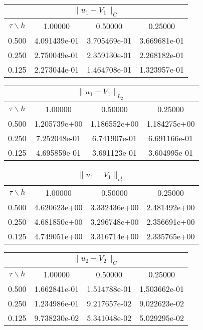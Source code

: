 \begin{center}
\begin{tabular}{||c|c|c|c||}
\hline
\hline
\multicolumn{4}{||c||}{$\|u_1-V_1\| _{C}$}\\ 
\hline
\hline
$\tau \backslash h$ & 1.00000 & 0.50000 & 0.25000\\ 
\hline 
0.500& 4.091439e-01 &3.705469e-01 &3.669681e-01 \\
\hline
0.250& 2.750049e-01 &2.359130e-01 &2.268182e-01 \\ 
\hline
0.125& 2.273044e-01 &1.464708e-01 &1.323957e-01 \\ 
\hline
\hline
\end{tabular}
\end{center}
\begin{center}
\begin{tabular}{||c|c|c|c||}
\hline
\hline
\multicolumn{4}{||c||}{$\|u_1-V_1\| _{L_2}$}\\ 
\hline
\hline 
$\tau \backslash h$ & 1.00000 & 0.50000 & 0.25000\\ 
\hline 
0.500& 1.205739e+00 &1.186552e+00 &1.184275e+00 \\
\hline
0.250& 7.252048e-01 &6.741907e-01 &6.691166e-01 \\ 
\hline
0.125& 4.695859e-01 &3.691123e-01 &3.604995e-01 \\ 
\hline
\hline
\end{tabular}
\end{center}
\begin{center}
\begin{tabular}{||c|c|c|c||}
\hline
\hline
\multicolumn{4}{||c||}{$\|u_1-V_1\| _{v_2^1}$}\\ 
\hline
\hline
$\tau \backslash h$ & 1.00000 & 0.50000 & 0.25000\\ 
\hline 
0.500& 4.620623e+00 &3.332436e+00 &2.481492e+00 \\
\hline
0.250& 4.681850e+00 &3.296748e+00 &2.356691e+00 \\ 
\hline
0.125& 4.749051e+00 &3.316714e+00 &2.335765e+00 \\ 
\hline
\hline
\end{tabular}
\end{center}
\begin{center}
\begin{tabular}{||c|c|c|c||}
\hline
\hline
\multicolumn{4}{||c||}{$\|u_2-V_2\| _{C}$}\\ 
\hline
\hline 
$\tau \backslash h$ & 1.00000 & 0.50000 & 0.25000\\ 
\hline 
0.500& 1.662841e-01 &1.514788e-01 &1.503662e-01 \\
\hline
0.250& 1.234986e-01 &9.217657e-02 &9.022623e-02 \\ 
\hline
0.125& 9.738230e-02 &5.341048e-02 &5.029295e-02 \\ 
\hline
\hline
\end{tabular}
\end{center}
